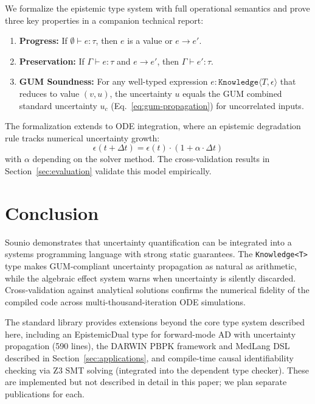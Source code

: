 \documentclass[11pt,a4paper]{article}
\begin{document}
We formalize the epistemic type system with full operational semantics and
prove three key properties in a companion technical report:

\begin{enumerate}
  \item \textbf{Progress:} If $\emptyset \vdash e : \tau$, then $e$ is a
        value or $e \longrightarrow e'$.
  \item \textbf{Preservation:} If $\Gamma \vdash e : \tau$ and
        $e \longrightarrow e'$, then $\Gamma \vdash e' : \tau$.
  \item \textbf{GUM Soundness:} For any well-typed expression
        $e : \texttt{Knowledge}\langle T, \epsilon \rangle$ that reduces to
        value $(v, u)$, the uncertainty $u$ equals the GUM combined standard
        uncertainty $u_c$ (Eq.~\ref{eq:gum-propagation}) for uncorrelated inputs.
\end{enumerate}

The formalization extends to ODE integration, where an epistemic degradation
rule tracks numerical uncertainty growth:
\[
  \epsilon(t + \Delta t) = \epsilon(t) \cdot (1 + \alpha \cdot \Delta t)
\]
with $\alpha$ depending on the solver method. The cross-validation results in
Section~\ref{sec:evaluation} validate this model empirically.

\section{Conclusion}
\label{sec:conclusion}

Sounio demonstrates that uncertainty quantification can be integrated into a
systems programming language with strong static guarantees. The
\texttt{Knowledge<T>} type makes GUM-compliant uncertainty propagation as
natural as arithmetic, while the algebraic effect system warns when
uncertainty is silently discarded. Cross-validation against analytical
solutions confirms the numerical fidelity of the compiled code across
multi-thousand-iteration ODE simulations.

The standard library provides extensions beyond the core type system
described here, including an EpistemicDual type for forward-mode AD with
uncertainty propagation (590 lines), the DARWIN PBPK framework and
MedLang DSL described in Section~\ref{sec:applications}, and compile-time
causal identifiability checking via Z3 SMT solving (integrated into the
dependent type checker). These are implemented but not described in detail
in this paper; we plan separate publications for each.
\end{document}
